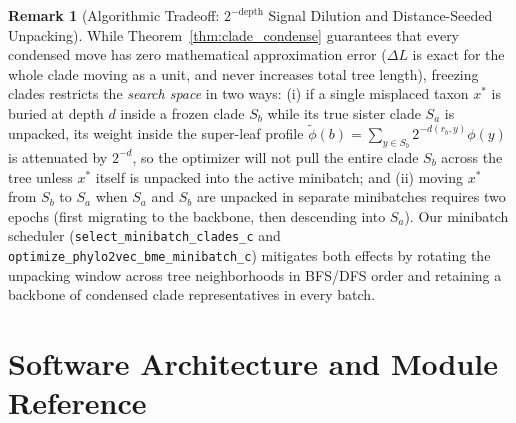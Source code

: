 \documentclass[11pt,a4paper]{article}
\theoremstyle{definition}
\newtheorem{remark}[theorem]{Remark}
\begin{document}
\begin{remark}[Algorithmic Tradeoff: $2^{-\text{depth}}$ Signal Dilution and Distance-Seeded Unpacking]
\label{rem:minibatch_tradeoffs}
While Theorem~\ref{thm:clade_condense} guarantees that every condensed move has zero mathematical approximation error ($\Delta L$ is exact for the whole clade moving as a unit, and never increases total tree length), freezing clades restricts the \emph{search space} in two ways: (i) if a single misplaced taxon $x^*$ is buried at depth $d$ inside a frozen clade $S_b$ while its true sister clade $S_a$ is unpacked, its weight inside the super-leaf profile $\widetilde{\phi}(b) = \sum_{y \in S_b} 2^{-d(r_b, y)} \phi(y)$ is attenuated by $2^{-d}$, so the optimizer will not pull the entire clade $S_b$ across the tree unless $x^*$ itself is unpacked into the active minibatch; and (ii) moving $x^*$ from $S_b$ to $S_a$ when $S_a$ and $S_b$ are unpacked in separate minibatches requires two epochs (first migrating to the backbone, then descending into $S_a$). Our minibatch scheduler (\texttt{select\_minibatch\_clades\_c} and \texttt{optimize\_phylo2vec\_bme\_minibatch\_c}) mitigates both effects by rotating the unpacking window across tree neighborhoods in BFS/DFS order and retaining a backbone of condensed clade representatives in every batch.
\end{remark}

\section{Software Architecture and Module Reference}
\label{sec:software}
\end{document}
